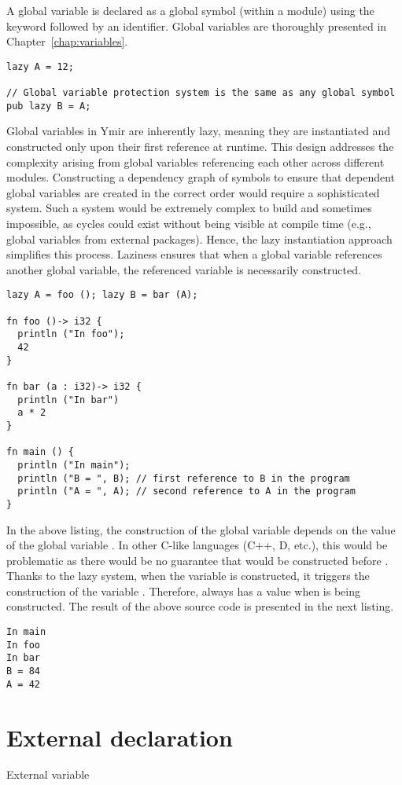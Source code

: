 A global variable is declared as a global symbol (within a module) using the
keyword  followed by an identifier. Global variables are thoroughly
presented in Chapter~\ref{chap:variables}.

\begin{lstlisting}[style=coloredverbatim]
lazy A = 12;

// Global variable protection system is the same as any global symbol
pub lazy B = A;
\end{lstlisting}

Global variables in Ymir are inherently lazy, meaning they are instantiated and
constructed only upon their first reference at runtime. This design addresses
the complexity arising from global variables referencing each other across
different modules. Constructing a dependency graph of symbols to ensure that
dependent global variables are created in the correct order would require a
sophisticated system. Such a system would be extremely complex to build and
sometimes impossible, as cycles could exist without being visible at compile
time (e.g., global variables from external packages). Hence, the lazy
instantiation approach simplifies this process. Laziness ensures that when a
global variable references another global variable, the referenced variable is
necessarily constructed.

\begin{lstlisting}[style=coloredverbatim]
lazy A = foo (); lazy B = bar (A);

fn foo ()-> i32 {
  println ("In foo");
  42
}

fn bar (a : i32)-> i32 {
  println ("In bar")
  a * 2
}

fn main () {
  println ("In main");
  println ("B = ", B); // first reference to B in the program
  println ("A = ", A); // second reference to A in the program
}
\end{lstlisting}

In the above listing, the construction of the global variable  depends
on the value of the global variable . In other C-like languages (C++,
D, etc.), this would be problematic as there would be no guarantee that
 would be constructed before . Thanks to the lazy system, when
the variable  is constructed, it triggers the construction of the
variable . Therefore,  always has a value when  is
being constructed. The result of the above source code is presented in the next
listing.

\begin{lstlisting}[style=bashVerb, escapechar=@+]
In main
In foo
In bar
B = 84
A = 42
\end{lstlisting}

\vfill%
\pagebreak

\section{External declaration}%
\label{sec:extern_var}

External variable
